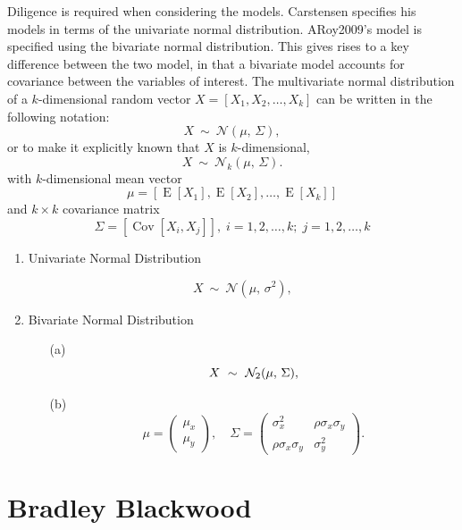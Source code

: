 \documentclass[12pt, a4paper]{report}
\theoremstyle{plain}
\theoremstyle{definition}
\theoremstyle{remark}
\begin{document}
	Diligence is required when considering the models. Carstensen specifies his models in terms of the univariate normal distribution. ARoy2009's model is specified using the bivariate normal distribution.
	This gives rises to a key difference between the two model, in that a bivariate model accounts for covariance between the variables of interest.
	The multivariate normal distribution of a $k$-dimensional random vector $X = [X_1, X_2, \ldots, X_k]$
	can be written in the following notation:
	\[
	X\ \sim\ \mathcal{N}(\mu,\, \Sigma),
	\]
	or to make it explicitly known that $X$ is $k$-dimensional,
	\[
	X\ \sim\ \mathcal{N}_k(\mu,\, \Sigma).
	\]
	with $k$-dimensional mean vector
	\[ \mu = [ \operatorname{E}[X_1], \operatorname{E}[X_2], \ldots, \operatorname{E}[X_k]] \]
	and $k \times k$ covariance matrix
	\[ \Sigma = [\operatorname{Cov}[X_i, X_j]], \; i=1,2,\ldots,k; \; j=1,2,\ldots,k \]
	
	\bigskip
	
	\begin{enumerate}
		\item Univariate Normal Distribution
		
		\[
		X\ \sim\ \mathcal{N}(\mu,\, \sigma^2),
		\]
		
		\item Bivariate Normal Distribution
		
		\begin{itemize}
			\item[(a)] \[  X\ \sim\ \mathcal{N}_2(\mu,\, \Sigma), \vspace{1cm}\]
			\item[(b)] \[    \mu = \begin{pmatrix} \mu_x \\ \mu_y \end{pmatrix}, \quad
			\Sigma = \begin{pmatrix} \sigma_x^2 & \rho \sigma_x \sigma_y \\
			\rho \sigma_x \sigma_y  & \sigma_y^2 \end{pmatrix}.\]
		\end{itemize}
	\end{enumerate}
	
	
	
	\chapter{Bradley Blackwood}
\end{document}
